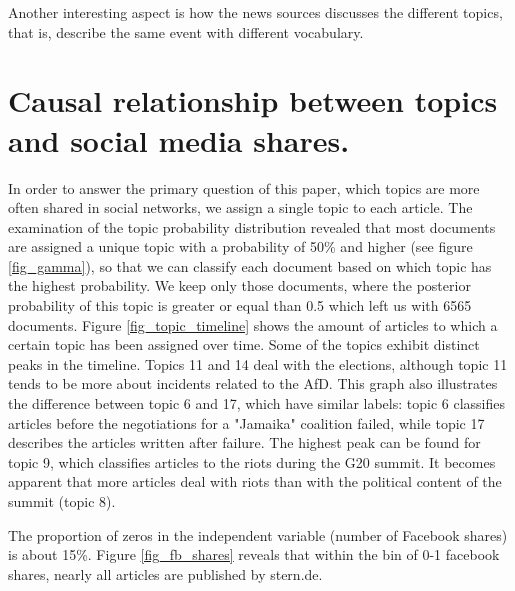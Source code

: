 \documentclass[12pt,a4paper,notitlepage]{article}
\begin{document}
Another interesting aspect is how the news sources discusses the different topics, that is, describe the same event with different vocabulary.


\section{Causal relationship between topics and social media shares.}\label{ch_regression}


In order to answer the primary question of this paper, which topics are more often shared in social networks, we assign a single topic to each article. The examination of the topic probability distribution revealed that most documents are assigned a unique topic with a probability of 50\% and higher (see figure \ref{fig_gamma}), so that we can classify each document based on which topic has the highest probability. We keep only those documents, where the posterior probability of this topic is greater or equal than 0.5 which left us with 6565 documents. Figure \ref{fig_topic_timeline} shows the amount of articles to which a certain topic has been assigned over time. Some of the topics exhibit distinct peaks in the timeline. Topics 11 and 14 deal with the elections, although topic 11 tends to be more about incidents related to the AfD. This graph also illustrates the difference between topic 6 and 17, which have similar labels: topic 6 classifies articles before the negotiations for a "Jamaika" coalition failed, while topic 17 describes the articles written after failure. The highest peak can be found for topic 9, which classifies articles to the riots during the G20 summit. It becomes apparent that more articles deal with riots than with the political content of the summit (topic 8). 

The proportion of zeros in the independent variable (number of Facebook shares) is about 15\%. Figure \ref{fig_fb_shares} reveals that within the bin of 0-1 facebook shares, nearly all articles are published by stern.de. 
\end{document}
